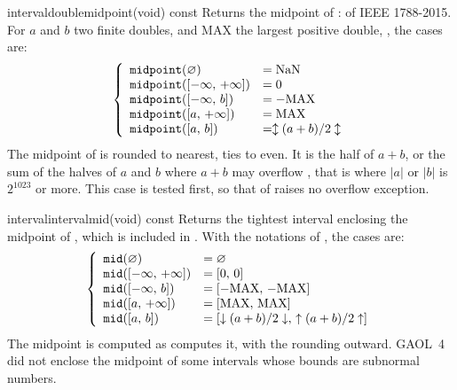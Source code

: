 \documentclass[12pt,a4paper,twoside,openright]{book}
\begin{document}
\begin{defmethod}{interval}{double}{midpoint}{(void) const}
  Returns the midpoint of :  of IEEE 1788-2015. For
  $a$ and $b$ two finite doubles, and MAX the largest positive double,
  , the cases are:
\begin{equation*}
\left\{\begin{array}{ll}
\texttt{midpoint}(\varnothing{})&=\text{NaN}\\
\texttt{midpoint}([-\infty,\,+\infty])&=0\\
\texttt{midpoint}([-\infty,\,b])&=-\text{MAX}\\
\texttt{midpoint}([a,\,+\infty])&=\text{MAX}\\
\texttt{midpoint}([a,\,b])&=\updownarrow(a+b)/2\updownarrow \\
\end{array}\right.
\end{equation*}
  The midpoint of  is rounded to nearest, ties to even. It is the
  half of $a+b$, or the sum of the halves of $a$ and $b$ where $a+b$ may
  overflow \cite{Goualard:TOMS2014}, that is where $|a|$ or $|b|$ is
  $2^{1023}$ or more. This case is tested first, so that 
  of  raises no overflow
  exception.\newinvfive
\end{defmethod}

\begin{defmethod}{interval}{interval}{mid}{(void) const}
  Returns the tightest interval enclosing the midpoint of ,
  which is included in . With the notations of
  , the cases are:
\begin{equation*}
\left\{\begin{array}{ll}
\texttt{mid}(\varnothing{})&=\varnothing{}\\
\texttt{mid}([-\infty,\,+\infty])&=[0,\,0]\\
\texttt{mid}([-\infty,\,b])&=[-\text{MAX},\,-\text{MAX}]\\
\texttt{mid}([a,\,+\infty])&=[\text{MAX},\,\text{MAX}]\\
\texttt{mid}([a,\,b])&=[\downarrow(a+b)/2\downarrow,\,\uparrow(a+b)/2\uparrow]
\end{array}\right.
\end{equation*}
  The midpoint is computed as  computes it, with the
  rounding outward. GAOL~4 did not enclose the midpoint of some intervals
  whose bounds are subnormal numbers.\newinvfive
\end{defmethod}
\end{document}
